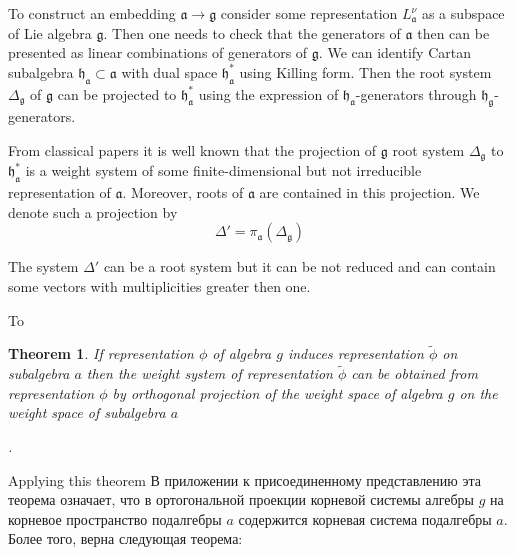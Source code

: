 \documentclass{article}
\newtheorem{theorem}{Theorem}
\newcommand{\gf}{\mathfrak{g}}
\newcommand{\af}{\mathfrak{a}}
\newcommand{\hf}{\mathfrak{h}}
\newcommand{\hfg}{\hf_{\gf}}
\newcommand{\hfa}{\hf_{\af}}
\begin{document}
To construct an embedding $\af\to\gf$ consider some representation $L^{\nu}_{\af}$ as a subspace of
Lie algebra $\gf$. Then one needs to check that the generators of $\af$ then can be presented as
linear combinations of generators of $\gf$. We can identify Cartan subalgebra $\hfa\subset \af$ with
dual space $\hfa^{*}$ using Killing form. Then the root system $\Delta_{\gf}$ of $\gf$ can be
projected to $\hfa^{*}$ using the expression of $\hfa$-generators through $\hfg$-generators.


From classical papers \cite{dynkin1952semisimple,dynkin1952maximal} it is well known that the
projection of $\gf$ root system $\Delta_{\gf}$ to $\hfa^{*}$ is a weight system of some
finite-dimensional but not irreducible representation of $\af$. Moreover, roots of $\af$ are
contained in this projection. We denote such a projection by
\begin{equation}
  \label{eq:2}
  \Delta'=\pi_{\af}\left(\Delta_{\gf}\right)
\end{equation}

The system $\Delta'$ can be a root system but it can be not reduced and can contain some vectors
with multiplicities greater then one. 



To 

\begin{theorem}\label{dyn0}
  If representation $\phi$ of algebra $g$ induces representation $\tilde\phi$ on subalgebra $a$ then
  the weight system of representation $\tilde\phi$ can be obtained from representation $\phi$ by
  orthogonal projection of the weight space of algebra $g$ on the weight space of subalgebra $a$

  \cite{dynkin1952maximal}. %
\end{theorem}

Applying this theorem
В приложении к присоединенному представлению эта теорема означает, что в ортогональной проекции
корневой системы алгебры $g$ на корневое пространство подалгебры $a$ содержится корневая система
подалгебры $a$. Более того, верна следующая теорема:
\end{document}
